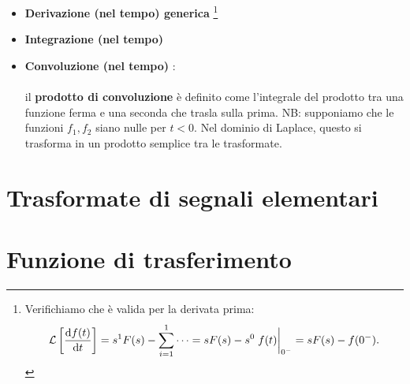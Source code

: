 \begin{itemize}
		\begin{proof}
	Usiamo la definizione di trasformata e applichiamo l'integrazione per parti:
	\begin{align*}
		\lt{\dv{f(t)}{t}} & = \ltint{\dv{f(t)}{t}}{-st}{t}	 = \eval{f(t)e^{-st}}_{0^-}^{\pinf} - \int_{0^-}^{\pinf} f(t)(-s)e^{-st} \dd{t} \\ & = 0 - f(0^-) + \int_{0^-}^{\pinf} sf(t)e^{-st} \dd{t} = - f(0^-) + s \int_{0^-}^{\pinf} f(t)e^{-st} \dd{t} \\ & = - f(0^-) + s \lt{f(t)} = sF(s) - f(0^-).
	\end{align*}
	\end{proof}
	\item \textbf{Derivazione (nel tempo) generica} \rarr {} \footnote{
	Verifichiamo che è valida per la derivata prima:
	\begin{equation*}
		\lt{\dv{f(t)}{t}} = s^1 F(s) - \sum_{i=1}^1 \cdots = s F(s) - s^{0} \eval{f(t)}_{0^-} = sF(s)-f(0^-).
	\end{equation*}}
	\item \textbf{Integrazione (nel tempo)} \rarr {}
\item \textbf{Convoluzione (nel tempo)} \rarr {} : \\ \\ il \textbf{prodotto di convoluzione} è definito come l'integrale del prodotto tra una funzione ferma e una seconda che trasla sulla prima. NB: supponiamo che le funzioni $f_1,f_2$ siano nulle per $t < 0$. Nel dominio di Laplace, questo si trasforma in un prodotto semplice tra le trasformate.
\end{itemize}

\section{Trasformate di segnali elementari}

\section{Funzione di trasferimento}


















